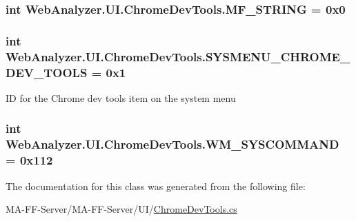 \subsubsection[{M\+F\+\_\+\+S\+T\+R\+I\+N\+G}]{\setlength{\rightskip}{0pt plus 5cm}int Web\+Analyzer.\+U\+I.\+Chrome\+Dev\+Tools.\+M\+F\+\_\+\+S\+T\+R\+I\+N\+G = 0x0\hspace{0.3cm}{\ttfamily [static]}}\label{class_web_analyzer_1_1_u_i_1_1_chrome_dev_tools_a244dc36662bbe1c31e4d104e1e9cfa30}
\hypertarget{class_web_analyzer_1_1_u_i_1_1_chrome_dev_tools_a732c882f4d627f0aae88b1a38ddf03d2}{}
\subsubsection[{S\+Y\+S\+M\+E\+N\+U\+\_\+\+C\+H\+R\+O\+M\+E\+\_\+\+D\+E\+V\+\_\+\+T\+O\+O\+L\+S}]{\setlength{\rightskip}{0pt plus 5cm}int Web\+Analyzer.\+U\+I.\+Chrome\+Dev\+Tools.\+S\+Y\+S\+M\+E\+N\+U\+\_\+\+C\+H\+R\+O\+M\+E\+\_\+\+D\+E\+V\+\_\+\+T\+O\+O\+L\+S = 0x1\hspace{0.3cm}{\ttfamily [static]}}\label{class_web_analyzer_1_1_u_i_1_1_chrome_dev_tools_a732c882f4d627f0aae88b1a38ddf03d2}


I\+D for the Chrome dev tools item on the system menu 

\hypertarget{class_web_analyzer_1_1_u_i_1_1_chrome_dev_tools_a4e5a194cb8f1eb30877f810655d14f6f}{}
\subsubsection[{W\+M\+\_\+\+S\+Y\+S\+C\+O\+M\+M\+A\+N\+D}]{\setlength{\rightskip}{0pt plus 5cm}int Web\+Analyzer.\+U\+I.\+Chrome\+Dev\+Tools.\+W\+M\+\_\+\+S\+Y\+S\+C\+O\+M\+M\+A\+N\+D = 0x112\hspace{0.3cm}{\ttfamily [static]}}\label{class_web_analyzer_1_1_u_i_1_1_chrome_dev_tools_a4e5a194cb8f1eb30877f810655d14f6f}


The documentation for this class was generated from the following file\+:\begin{DoxyCompactItemize}
\item 
M\+A-\/\+F\+F-\/\+Server/\+M\+A-\/\+F\+F-\/\+Server/\+U\+I/\hyperlink{_chrome_dev_tools_8cs}{Chrome\+Dev\+Tools.\+cs}\end{DoxyCompactItemize}
